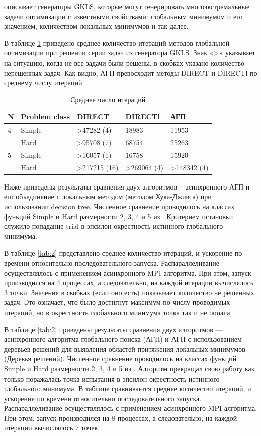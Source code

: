 \documentclass{svproc}
\begin{document}
\cite{fio_bib13, fio_bib17} описывает генераторы GKLS, которые могут генерировать многоэкстремальные задачи оптимизации с известными свойствами: глобальным минимумом и его значением, количеством локальных минимумов и так далее.

В таблице \ref{tab:1} приведено среднее количество итераций методов глобальной оптимизации при решении серии задач из генератора GKLS. Знак «>» указывает на ситуацию, когда не все задачи были решены, в скобках указано количество нерешенных задач. Как видно, АГП превосходит методы DIRECT и DIRECTl по среднему числу итераций. 




\begin{table}[!ht]
    \caption{Среднее число итераций}
    \label{tab:1}
    \centering
    \begin{tabular}{|l|l|l|l|l|}
    \hline
        N & Problem class & DIRECT & DIRECTl & АГП  \\ \hline
        4 & Simple & >47282 (4) & 18983 & 11953  \\ \hline
        ~ & Hard & >95708 (7) & 68754 & 25263  \\ \hline
        5 & Simple & >16057 (1) & 16758 & 15920  \\ \hline
        ~ & Hard & >217215 (16) & >269064 (4) & >148342 (4)  \\ \hline
    \end{tabular}
\end{table}




Ниже приведены результаты сравнения двух алгоритмов – асинхронного АГП и его объединение с локальным методом (методом Хука-Дживса) при использовании decision tree. Численное сравнение проводилось на классах функций Simple и Hard размерности 2, 3, 4 и 5 из \cite{fio_bib19}. Критерием остановки служило попадание trial в эпсилон окрестность истинного глобального минимума. 

В таблице \ref{tab:2} представлено среднее количество итераций, и ускорение по времени относительно последовательного запуска. Распараллеливание  осуществлялось с применением асинхронного MPI алгоритма. При этом, запуск производился на 4 процессах, а следовательно, на каждой итерации вычислялось 3 точки. Значение в скобках (если оно есть) показывает количество не решенных задач. Это означает, что было достигнут максимум по числу проводимых итераций, но в окрестность глобального минимума точка так и не попала.


В таблице \ref{tab:2} приведены результаты сравнения двух алгоритмов –-- асинхронного алгоритма глобального поиска (АГП) и АГП с использованием деревьев решений для выявления областей притяжения локальных минимумов (Деревья решений). Численное сравнение проводилось на классах функций Simple и Hard размерности 2, 3, 4 и 5 из \cite{fio_bib19}. Алгоритм прекращал свою работу как только поражалась точка испытания в эпсилон окрестность истинного глобального минимума. В таблице сравнивается среднее количество итераций, и ускорение по времени относительно последовательного запуска. Распараллеливание  осуществлялось с применением асинхронного MPI алгоритма. При этом, запуск производился на 8 процессах, а следовательно, на каждой итерации вычислялось 7 точек.
\end{document}
